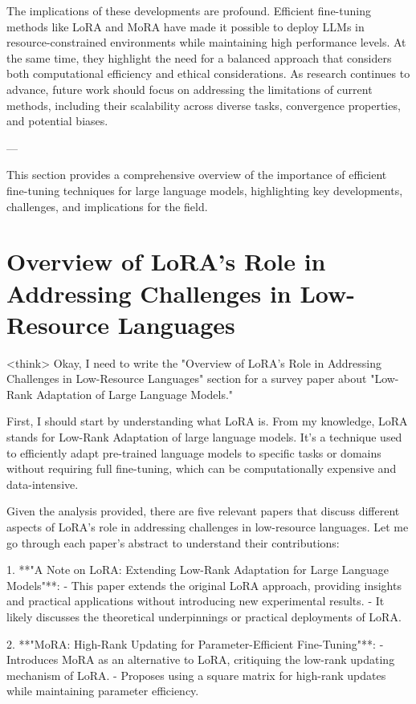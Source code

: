 \documentclass[conference]{IEEEtran}
\begin{document}
The implications of these developments are profound. Efficient fine-tuning methods like LoRA and MoRA have made it possible to deploy LLMs in resource-constrained environments while maintaining high performance levels. At the same time, they highlight the need for a balanced approach that considers both computational efficiency and ethical considerations. As research continues to advance, future work should focus on addressing the limitations of current methods, including their scalability across diverse tasks, convergence properties, and potential biases.

---

This section provides a comprehensive overview of the importance of efficient fine-tuning techniques for large language models, highlighting key developments, challenges, and implications for the field.

\section{Overview of LoRA's Role in Addressing Challenges in Low-Resource Languages}
<think>
Okay, I need to write the "Overview of LoRA's Role in Addressing Challenges in Low-Resource Languages" section for a survey paper about "Low-Rank Adaptation of Large Language Models." 

First, I should start by understanding what LoRA is. From my knowledge, LoRA stands for Low-Rank Adaptation of large language models. It's a technique used to efficiently adapt pre-trained language models to specific tasks or domains without requiring full fine-tuning, which can be computationally expensive and data-intensive.

Given the analysis provided, there are five relevant papers that discuss different aspects of LoRA's role in addressing challenges in low-resource languages. Let me go through each paper's abstract to understand their contributions:

1. **"A Note on LoRA: Extending Low-Rank Adaptation for Large Language Models"**:
   - This paper extends the original LoRA approach, providing insights and practical applications without introducing new experimental results.
   - It likely discusses the theoretical underpinnings or practical deployments of LoRA.

2. **"MoRA: High-Rank Updating for Parameter-Efficient Fine-Tuning"**:
   - Introduces MoRA as an alternative to LoRA, critiquing the low-rank updating mechanism of LoRA.
   - Proposes using a square matrix for high-rank updates while maintaining parameter efficiency.
\end{document}
